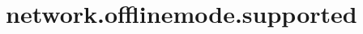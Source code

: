 \section{network.offlinemode.supported}
\label{configuration:NetworkOfflinemodeSupported}
\AvailableInJavaAndCsharp{\TODO}